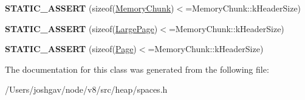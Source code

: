 \begin{DoxyCompactItemize}
\item 
{\bfseries S\+T\+A\+T\+I\+C\+\_\+\+A\+S\+S\+E\+RT} (sizeof(\hyperlink{classv8_1_1internal_1_1_memory_chunk}{Memory\+Chunk})$<$=Memory\+Chunk\+::k\+Header\+Size)\hypertarget{classv8_1_1internal_1_1_memory_chunk_validator_aec9915277978bce71ab4bd8af18ea40a}{}\label{classv8_1_1internal_1_1_memory_chunk_validator_aec9915277978bce71ab4bd8af18ea40a}

\item 
{\bfseries S\+T\+A\+T\+I\+C\+\_\+\+A\+S\+S\+E\+RT} (sizeof(\hyperlink{classv8_1_1internal_1_1_large_page}{Large\+Page})$<$=Memory\+Chunk\+::k\+Header\+Size)\hypertarget{classv8_1_1internal_1_1_memory_chunk_validator_a33bc77c0a2871d7b5c8af630c1a647df}{}\label{classv8_1_1internal_1_1_memory_chunk_validator_a33bc77c0a2871d7b5c8af630c1a647df}

\item 
{\bfseries S\+T\+A\+T\+I\+C\+\_\+\+A\+S\+S\+E\+RT} (sizeof(\hyperlink{classv8_1_1internal_1_1_page}{Page})$<$=Memory\+Chunk\+::k\+Header\+Size)\hypertarget{classv8_1_1internal_1_1_memory_chunk_validator_a013d9a3319a99173322076b20d006fac}{}\label{classv8_1_1internal_1_1_memory_chunk_validator_a013d9a3319a99173322076b20d006fac}

\end{DoxyCompactItemize}


The documentation for this class was generated from the following file\+:\begin{DoxyCompactItemize}
\item 
/\+Users/joshgav/node/v8/src/heap/spaces.\+h\end{DoxyCompactItemize}
